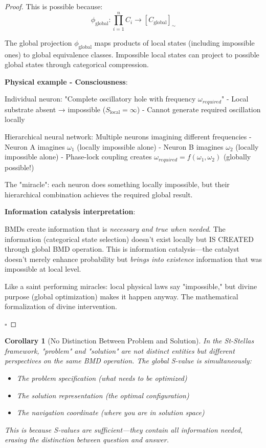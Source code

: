 \documentclass[12pt,a4paper]{article}
\newtheorem{corollary}[theorem]{Corollary}
\begin{document}
\begin{proof}
This is possible because:
\begin{equation}
\phi_{\text{global}}: \prod_{i=1}^n C_i \to [C_{\text{global}}]_{\sim}
\end{equation}

The global projection $\phi_{\text{global}}$ maps products of local states (including impossible ones) to global equivalence classes. Impossible local states can project to possible global states through categorical compression.

\textbf{Physical example - Consciousness}:

Individual neuron: "Complete oscillatory hole with frequency $\omega_{required}$"
- Local substrate absent → impossible ($S_{\text{local}} = \infty$)
- Cannot generate required oscillation locally

Hierarchical neural network: Multiple neurons imagining different frequencies
- Neuron A imagines $\omega_1$ (locally impossible alone)
- Neuron B imagines $\omega_2$ (locally impossible alone)
- Phase-lock coupling creates $\omega_{required} = f(\omega_1, \omega_2)$ (globally possible!)

The "miracle": each neuron does something locally impossible, but their hierarchical combination achieves the required global result.

\textbf{Information catalysis interpretation}:

BMDs create information that is \textit{necessary and true when needed}. The information (categorical state selection) doesn't exist locally but IS CREATED through global BMD operation. This is information catalysis—the catalyst doesn't merely enhance probability but \textit{brings into existence} information that was impossible at local level.

Like a saint performing miracles: local physical laws say "impossible," but divine purpose (global optimization) makes it happen anyway. The mathematical formalization of divine intervention.

$\square$
\end{proof}

\begin{corollary}[No Distinction Between Problem and Solution]
\label{cor:problem_solution_identity}
In the St-Stellas framework, "problem" and "solution" are not distinct entities but different perspectives on the same BMD operation. The global S-value is simultaneously:
\begin{itemize}
\item The problem specification (what needs to be optimized)
\item The solution representation (the optimal configuration)
\item The navigation coordinate (where you are in solution space)
\end{itemize}

This is because S-values are \textit{sufficient}—they contain all information needed, erasing the distinction between question and answer.
\end{corollary}
\end{document}
